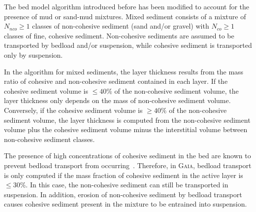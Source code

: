 The bed model algorithm introduced before has been modified to account for the presence of mud or sand-mud mixtures.
Mixed sediment consists of a mixture of $N_{nco} \geq 1$ classes of non-cohesive sediment (sand and/or gravel) with $N_{co} \geq 1$ classes of fine, cohesive sediment. Non-cohesive sediments are assumed to be transported by bedload and/or suspension, while cohesive sediment is transported only by suspension.

In the algorithm for mixed sediments, the layer thickness results from the mass ratio of cohesive and non-cohesive sediment contained in each layer. If the cohesive sediment volume is $\leq 40\%$ of the non-cohesive sediment volume, the layer thickness only depends on the mass of non-cohesive sediment volume. Conversely, if the cohesive sediment volume is $\geq 40\%$ of the non-cohesive sediment volume, the layer thickness is computed from the non-cohesive sediment volume plus the cohesive sediment volume minus the interstitial volume between non-cohesive sediment classes.

The presence of high concentrations of cohesive sediment in the bed are known to prevent bedload transport from occurring~\cite{vanLedden}. Therefore, in \textsc{Gaia}, bedload transport is only computed if the mass fraction of cohesive sediment in the active layer is $\leq 30\%$. In this case, the non-cohesive sediment can still be transported in suspension. In addition, erosion of non-cohesive sediment by bedload transport causes cohesive sediment present in the mixture to be entrained into suspension.



